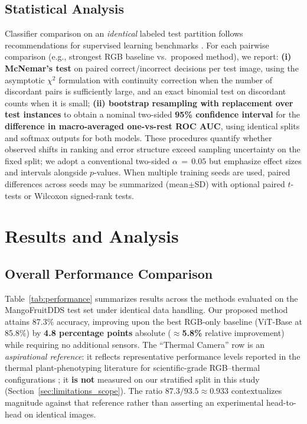 \documentclass[utf8]{FrontiersinHarvard} %
\begin{document}
\subsection{Statistical Analysis}
\label{sec:statistical_analysis}
Classifier comparison on an \emph{identical} labeled test partition follows recommendations for supervised learning benchmarks \cite{dietterich1998}. For each pairwise comparison (e.g., strongest RGB baseline vs.\ proposed method), we report: \textbf{(i) McNemar's test} on paired correct/incorrect decisions per test image, using the asymptotic $\chi^2$ formulation with continuity correction when the number of discordant pairs is sufficiently large, and an exact binomial test on discordant counts when it is small; \textbf{(ii) bootstrap resampling with replacement over test instances} to obtain a nominal two-sided \textbf{95\% confidence interval} for the \textbf{difference in macro-averaged one-vs-rest ROC AUC}, using identical splits and softmax outputs for both models. These procedures quantify whether observed shifts in ranking and error structure exceed sampling uncertainty on the fixed split; we adopt a conventional two-sided $\alpha\,{=}\,0.05$ but emphasize effect sizes and intervals alongside $p$-values. When multiple training seeds are used, paired differences across seeds may be summarized (mean$\pm$SD) with optional paired $t$-tests or Wilcoxon signed-rank tests.

\section{Results and Analysis}

\subsection{Overall Performance Comparison}
Table~\ref{tab:performance} summarizes results across the methods evaluated on the MangoFruitDDS test set under identical data handling. Our proposed method attains 87.3\% accuracy, improving upon the best RGB-only baseline (ViT-Base at 85.8\%) by \textbf{4.8 percentage points} absolute (\textbf{$\approx$5.8\%} relative improvement) while requiring no additional sensors. The ``Thermal Camera'' row is an \textit{aspirational reference}: it reflects representative performance levels reported in the thermal plant-phenotyping literature for scientific-grade RGB--thermal configurations \cite{khanal2017,pineda2021}; it \textbf{is not} measured on our stratified split in this study (Section~\ref{sec:limitations_scope}). The ratio $87.3/93.5 \approx 0.933$ contextualizes magnitude against that reference rather than asserting an experimental head-to-head on identical images.
\end{document}
